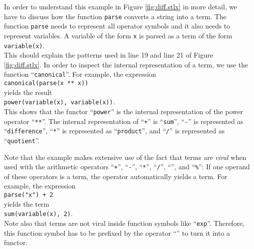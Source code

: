 In order to understand this example in Figure \ref{fig:diff.stlx} in more
detail, we have to discuss how the function \texttt{parse} converts a string into a term.  The
function \texttt{parse} needs to represent all operator symbols and it also needs to represent
variables.  A variable of the form \texttt{x} is parsed as a
term of the form
\\[0.2cm]
\hspace*{1.3cm}
\texttt{variable(x)}.
\\[0.2cm]
This should explain the patterns used in line 19 and line 21 of Figure \ref{fig:diff.stlx}.
In order to inspect the internal representation of a term, we  use the function
``\texttt{canonical}''.  For example, the expression
\\[0.2cm]
\hspace*{1.3cm}
\texttt{canonical(parse(x ** x))}
\\[0.2cm]
yields the result
\\[0.2cm]
\hspace*{1.3cm}
\texttt{power(variable(x), variable(x))}.
\\[0.2cm]
This shows that the functor ``\texttt{power}'' is the internal representation of the
power operator ``\texttt{**}''.  The internal representation of 
``\texttt{+}'' is ``\texttt{sum}'',
``\texttt{-}'' is represented as ``\texttt{difference}'',
``\texttt{*}'' is represented as ``\texttt{product}'', and
``\texttt{/}'' is represented as ``\texttt{quotient}''.

Note that the example makes extensive use of the fact that terms are \emph{viral} when used with
the arithmetic operators 
``\texttt{+}'', ``\texttt{-}'', ``\texttt{*}'', ``\texttt{/}'', ``\texttt{}'', and
``\texttt{\%}'':  
If one operand of these operators is a term, the operator automatically yields a term.
For example, the expression 
\\[0.2cm]
\hspace*{1.3cm}
\texttt{parse("x") + 2}
\\[0.2cm]
yields the term
\\[0.2cm]
\hspace*{1.3cm}
\texttt{sum(variable(x), 2)}.
\\[0.2cm]
Note also that terms are not viral inside function symbols like ``\texttt{exp}''.  Therefore, this
function symbol has to be prefixed by the operator ``\texttt{}'' to turn it
into a functor.

